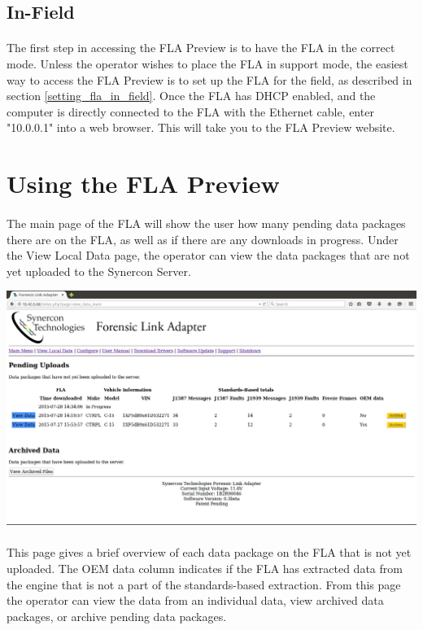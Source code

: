 \documentclass[11pt, oneside]{book}
\begin{document}
\subsection{In-Field}
\paragraph{  }
The first step in accessing the FLA Preview is to have the FLA in the correct mode. Unless the operator wishes to place the FLA in support mode, the easiest way to access the FLA Preview is to set up the FLA for the field, as described in section \ref{setting_fla_in_field}. Once the FLA has DHCP enabled, and the computer is directly connected to the FLA with the Ethernet cable, enter "10.0.0.1" into a web browser. This will take you to the FLA Preview website.
\section{Using the FLA Preview}
\paragraph{}
The main page of the FLA will show the user how many pending data packages there are on the FLA, as well as if there are any downloads in progress. Under the View Local Data page, the operator can view the data packages that are not yet uploaded to the Synercon Server.
\begin{center}
\includegraphics[width=1\linewidth]{../media/fla_preview_screenshots/local_data}
\end{center}
\paragraph{  }
This page gives a brief overview of each data package on the FLA that is not yet uploaded. The OEM data column indicates if the FLA has extracted data from the engine that is not a part of the standards-based extraction. From this page the operator can view the data from an individual data, view archived data packages, or archive pending data packages.
\end{document}
